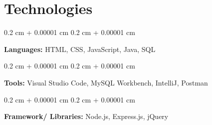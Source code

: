\documentclass[10pt, letterpaper]{article}
\newenvironment{onecolentry}{
    \begin{adjustwidth}{
        0.2 cm + 0.00001 cm
    }{
        0.2 cm + 0.00001 cm
    }
}{
    \end{adjustwidth}
} %
\begin{document}
    \section{Technologies}

        
        \begin{onecolentry}
            \textbf{Languages:} HTML, CSS, JavaScript, Java, SQL
        \end{onecolentry}

        \vspace{0.2 cm}

        \begin{onecolentry}
            \textbf{Tools:} Visual Studio Code, MySQL Workbench, IntelliJ, Postman
        \end{onecolentry}

        \vspace{0.2 cm}

        \begin{onecolentry}
            \textbf{Framework/ Libraries:} Node.js, Express.js, jQuery
        \end{onecolentry}


    \vspace{-0.3cm}
 
    
\end{document}
